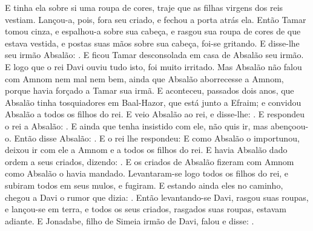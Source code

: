 {  E tinha ela sobre si uma roupa de cores, traje que as filhas virgens dos reis vestiam. Lançou-a, pois, fora seu criado, e fechou a porta atrás ela.
  Então Tamar tomou cinza, e espalhou-a sobre sua cabeça, e rasgou sua roupa de cores de que estava vestida, e postas suas mãos sobre sua cabeça, foi-se gritando.
  E disse-lhe seu irmão Absalão: . E ficou Tamar desconsolada em casa de Absalão seu irmão.
  E logo que o rei Davi ouviu tudo isto, foi muito irritado.
  Mas Absalão não falou com Amnom nem mal nem bem, ainda que Absalão aborrecesse a Amnom, porque havia forçado a Tamar sua irmã.
  E aconteceu, passados dois anos, que Absalão tinha tosquiadores em Baal-Hazor, que está junto a Efraim; e convidou Absalão a todos os filhos do rei.
  E veio Absalão ao rei, e disse-lhe: .
  E respondeu o rei a Absalão: . E ainda que tenha insistido com ele, não quis ir, mas abençoou-o.
  Então disse Absalão: . E o rei lhe respondeu: 
  E como Absalão o importunou, deixou ir com ele a Amnom e a todos os filhos do rei.
  E havia Absalão dado ordem a seus criados, dizendo: . %
  E os criados de Absalão fizeram com Amnom como Absalão o havia mandado. Levantaram-se logo todos os filhos do rei, e subiram todos em seus mulos, e fugiram.
  E estando ainda eles no caminho, chegou a Davi o rumor que dizia: .
  Então levantando-se Davi, rasgou suas roupas, e lançou-se em terra, e todos os seus criados, rasgados suas roupas, estavam adiante.
  E Jonadabe, filho de Simeia irmão de Davi, falou e disse: .
}
